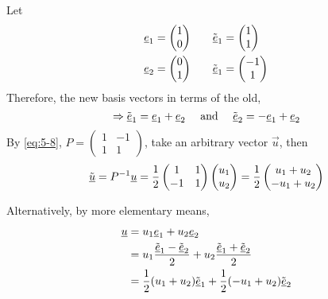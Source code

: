 \documentclass{article}
\numberwithin{equation}{section}
\begin{document}
\begin{eg}
    Let
    \begin{align*}
        \underline{e}_1 = \begin{pmatrix} 
            1 \\ 0
        \end{pmatrix} & \qquad
        \tilde{\underline{e}}_1 = \begin{pmatrix}
            1 \\ 1
        \end{pmatrix} \\
        \underline{e}_2 = \begin{pmatrix}
            0 \\ 1
        \end{pmatrix} & \qquad
        \tilde{\underline{e}}_1 = \begin{pmatrix}
            -1 \\ 1
        \end{pmatrix}
    \end{align*}
    Therefore, the new basis vectors in terms of the old,
    \[
        \Rightarrow \tilde{\underline{e}}_1 = \underline{e}_1 + \underline{e}_2 \quad \text{ and } \quad \tilde{\underline{e}}_2 = - \underline{e}_1 + \underline{e}_2
    \]
    By \eqref{eq:5-8}, $P = \begin{pmatrix}
        1 & -1 \\
        1 & 1
    \end{pmatrix}$, take an arbitrary vector $\vec u$, then
    \[
        \tilde{\underline{u}} = P^{-1} \underline{u} = \frac{1}{2}\begin{pmatrix}
            1 & 1 \\
            -1 & 1
        \end{pmatrix}
        \begin{pmatrix}
            u_1 \\ u_2
        \end{pmatrix}
        = \frac{1}{2} \begin{pmatrix}
            u_1 + u_2 \\
            -u_1 + u_2
        \end{pmatrix}
    \]
    
    Alternatively, by more elementary means,
    \begin{align*}
        \underline{u} &= u_1 \underline{e}_1 + u_2 \underline{e}_2 \\
        &= u_1 \frac{\tilde{\underline{e}}_1 - \tilde{\underline{e}}_2}{2} + u_2 \frac{\tilde{\underline{e}}_1 + \tilde{\underline{e}}_2}{2} \\
        &= \frac{1}{2}(u_1 + u_2) \tilde{\underline{e}}_1 + \frac{1}{2}(-u_1 + u_2) \tilde{\underline{e}}_2
    \end{align*}
\end{eg}
\end{document}
